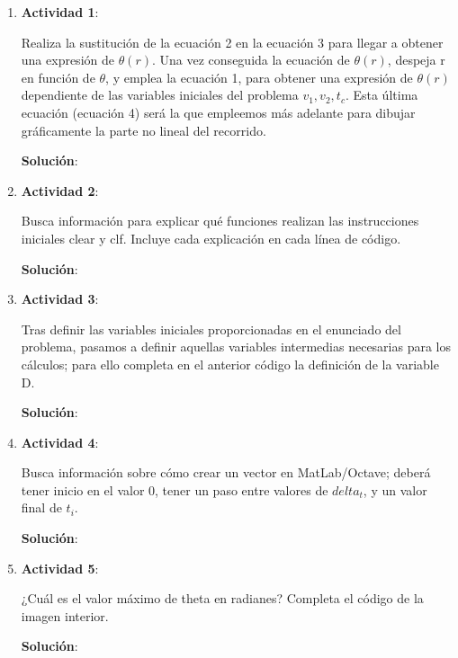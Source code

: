 \documentclass[11pt,letterpaper]{article}
\begin{document}
\begin{enumerate}

	\item \textbf{Actividad 1}:
	
	Realiza la sustitución de la ecuación 2 en la ecuación 3 para llegar a obtener una expresión de $\theta(r)$. Una vez conseguida la ecuación de $\theta(r)$, 
	despeja r en función de $\theta$, y emplea la ecuación 1, para obtener una expresión de $\theta(r)$ dependiente de las variables iniciales del problema 
	$v_{1}, v_{2}, t_{c}$. Esta última ecuación (ecuación 4) será la que empleemos más adelante para dibujar gráficamente la parte no lineal del recorrido.

	\textbf{Solución}: 


	\item \textbf{Actividad 2}:
	
	Busca información para explicar qué funciones realizan las instrucciones iniciales clear y clf. Incluye cada explicación en cada línea de código.

	\textbf{Solución}: 
	

	\item \textbf{Actividad 3}:
	
	Tras definir las variables iniciales proporcionadas en el enunciado del problema, pasamos a definir aquellas variables intermedias necesarias para los cálculos; 
	para ello completa en el anterior código la definición de la variable D.

	\textbf{Solución}: 
	
	
	\item \textbf{Actividad 4}:
	
	Busca información sobre cómo crear un vector en MatLab/Octave; deberá tener inicio en el valor 0, tener un paso entre valores de $delta_t$, y un valor final de $t_{i}$.

	\textbf{Solución}: 

	
	\item \textbf{Actividad 5}:
	
	¿Cuál es el valor máximo de theta en radianes? Completa el código de la imagen interior.

	\textbf{Solución}: 

	

\end{enumerate}
\end{document}
